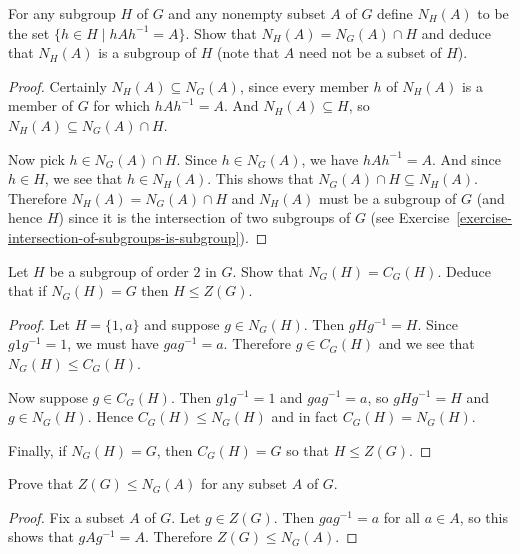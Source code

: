  For any subgroup $H$ of $G$ and any nonempty subset $A$ of
$G$ define $N_H(A)$ to be the set $\{h\in H \mid hAh^{-1} = A\}$. Show
that $N_H(A) = N_G(A)\cap H$ and deduce that $N_H(A)$ is a subgroup of
$H$ (note that $A$ need not be a subset of $H$).
\begin{proof}
  Certainly $N_H(A)\subseteq N_G(A)$, since every member $h$ of
  $N_H(A)$ is a member of $G$ for which $hAh^{-1} = A$. And
  $N_H(A)\subseteq H$, so $N_H(A)\subseteq N_G(A)\cap H$.

  Now pick $h\in N_G(A)\cap H$. Since $h\in N_G(A)$, we have
  $hAh^{-1} = A$. And since $h\in H$, we see that $h\in N_H(A)$. This
  shows that $N_G(A)\cap H\subseteq N_H(A)$. Therefore
  $N_H(A) = N_G(A)\cap H$ and $N_H(A)$ must be a subgroup of $G$ (and
  hence $H$) since it is the intersection of two subgroups of $G$ (see
  Exercise~\ref{exercise-intersection-of-subgroups-is-subgroup}).
\end{proof}

 Let $H$ be a subgroup of order $2$ in $G$. Show that
$N_G(H) = C_G(H)$. Deduce that if $N_G(H) = G$ then $H\leq Z(G)$.
\begin{proof}
  Let $H = \{1, a\}$ and suppose $g\in N_G(H)$. Then $gHg^{-1} =
  H$. Since $g1g^{-1} = 1$, we must have $gag^{-1} = a$. Therefore
  $g\in C_G(H)$ and we see that $N_G(H)\leq C_G(H)$.

  Now suppose $g\in C_G(H)$. Then $g1g^{-1} = 1$ and $gag^{-1} = a$,
  so $gHg^{-1} = H$ and $g\in N_G(H)$. Hence $C_G(H)\leq N_G(H)$ and
  in fact $C_G(H) = N_G(H)$.

  Finally, if $N_G(H) = G$, then $C_G(H) = G$ so that $H\leq Z(G)$.
\end{proof}

 Prove that $Z(G)\leq N_G(A)$ for any subset $A$ of $G$.
\begin{proof}
  Fix a subset $A$ of $G$. Let $g\in Z(G)$. Then $gag^{-1} = a$ for
  all $a\in A$, so this shows that $gAg^{-1} = A$. Therefore
  $Z(G)\leq N_G(A)$.
\end{proof}

